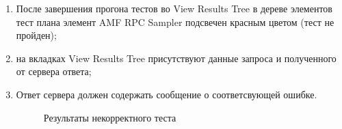 \begin{enumerate}
\item После завершения прогона тестов во View Results Tree в дереве элементов тест плана элемент AMF RPC Sampler
подсвечен красным цветом (тест не пройден);
\item на вкладках View Results Tree присутствуют данные запроса и полученного от сервера ответа;
\item Ответ сервера должен содержать сообщение о соответсвующей ошибке.

\begin{figure}[ht]
\caption{Результаты некорректного теста}
\label{ris:negativeTest.png}
\end{figure}

\end{enumerate}

